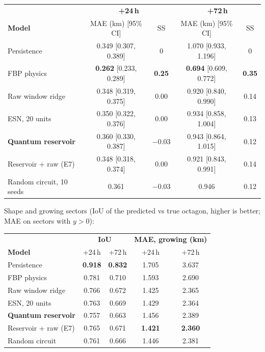 \documentclass[11pt,a4paper]{article}
\begin{document}
\begin{center}\small
\begin{tabular}{@{}l c c c c@{}}
\toprule
& \multicolumn{2}{c}{\textbf{+24\,h}} & \multicolumn{2}{c}{\textbf{+72\,h}}\\
\textbf{Model} & MAE (km) [95\% CI] & SS & MAE (km) [95\% CI] & SS\\
\midrule
Persistence & 0.349 [0.307, 0.389] & 0 & 1.070 [0.933, 1.196] & 0\\
FBP physics & \textbf{0.262} [0.233, 0.289] & \textbf{0.25} & \textbf{0.694} [0.609, 0.772] & \textbf{0.35}\\
Raw window ridge & 0.348 [0.319, 0.375] & 0.00 & 0.920 [0.840, 0.990] & 0.14\\
ESN, 20 units & 0.350 [0.322, 0.376] & 0.00 & 0.934 [0.858, 1.004] & 0.13\\
\textbf{Quantum reservoir} & 0.360 [0.330, 0.387] & $-0.03$ & 0.943 [0.864, 1.015] & 0.12\\
Reservoir + raw (E7) & 0.348 [0.318, 0.374] & 0.00 & 0.921 [0.843, 0.991] & 0.14\\
Random circuit, 10 seeds & 0.361 & $-0.03$ & 0.946 & 0.12\\
\bottomrule
\end{tabular}
\end{center}

Shape and growing sectors (IoU of the predicted vs true octagon, higher is better; MAE on sectors with $y>0$):
\begin{center}\small
\begin{tabular}{@{}l c c c c@{}}
\toprule
& \multicolumn{2}{c}{\textbf{IoU}} & \multicolumn{2}{c}{\textbf{MAE, growing (km)}}\\
\textbf{Model} & +24\,h & +72\,h & +24\,h & +72\,h\\
\midrule
Persistence & \textbf{0.918} & \textbf{0.832} & 1.705 & 3.637\\
FBP physics & 0.781 & 0.710 & 1.593 & 2.690\\
Raw window ridge & 0.766 & 0.672 & 1.425 & 2.365\\
ESN, 20 units & 0.763 & 0.669 & 1.429 & 2.364\\
\textbf{Quantum reservoir} & 0.757 & 0.663 & 1.456 & 2.389\\
Reservoir + raw (E7) & 0.765 & 0.671 & \textbf{1.421} & \textbf{2.360}\\
Random circuit & 0.761 & 0.666 & 1.446 & 2.381\\
\bottomrule
\end{tabular}
\end{center}
\end{document}
